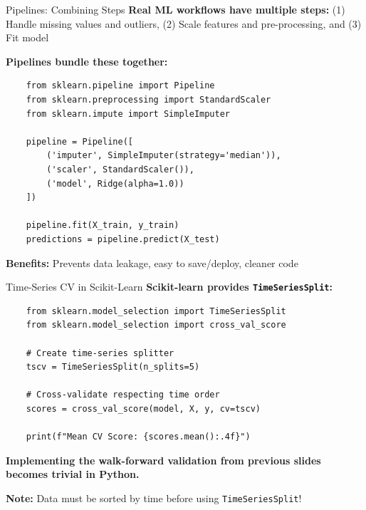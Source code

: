 \documentclass[10pt]{beamer}
\newcommand{\highlight}[1]{\textcolor{AccentOrange}{\textbf{#1}}}
\begin{document}
\begin{frame}[fragile]{Pipelines: Combining Steps}
  \textbf{Real ML workflows have multiple steps:} (1) Handle missing values and outliers, (2) Scale features and pre-processing, and (3) Fit model
    
  \vspace{1em}
  \textbf{Pipelines bundle these together:}
  
\begin{verbatim}
    from sklearn.pipeline import Pipeline
    from sklearn.preprocessing import StandardScaler
    from sklearn.impute import SimpleImputer
    
    pipeline = Pipeline([
        ('imputer', SimpleImputer(strategy='median')),
        ('scaler', StandardScaler()),
        ('model', Ridge(alpha=1.0))
    ])
    
    pipeline.fit(X_train, y_train)
    predictions = pipeline.predict(X_test)
\end{verbatim}
  
  \vspace{0.3em}
  \textbf{Benefits:} Prevents data leakage, easy to save/deploy, cleaner code
\end{frame}

\begin{frame}[fragile]{Time-Series CV in Scikit-Learn}
  \textbf{Scikit-learn provides \texttt{TimeSeriesSplit}:}
  
  \vspace{0.5em}
\begin{verbatim}
    from sklearn.model_selection import TimeSeriesSplit
    from sklearn.model_selection import cross_val_score
    
    # Create time-series splitter
    tscv = TimeSeriesSplit(n_splits=5)
    
    # Cross-validate respecting time order
    scores = cross_val_score(model, X, y, cv=tscv)
    
    print(f"Mean CV Score: {scores.mean():.4f}")
\end{verbatim}
  
  \vspace{0.5em}
  \highlight{Implementing the walk-forward validation from previous slides becomes trivial in Python.}
  
  \vspace{0.5em}
  \textbf{Note:} Data must be sorted by time before using \texttt{TimeSeriesSplit}!
\end{frame}


\end{document}
